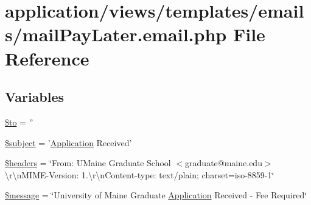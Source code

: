 \hypertarget{mail_pay_later_8email_8php}{\section{application/views/templates/emails/mail\-Pay\-Later.email.\-php File Reference}
\label{mail_pay_later_8email_8php}
}
\subsection*{Variables}
\begin{DoxyCompactItemize}
\item 
\hyperlink{mail_pay_later_8email_8php_ac19f839b525d6d99d063fe56bf2a6d3b}{\$to} = ''
\item 
\hyperlink{mail_pay_later_8email_8php_afea90503726cd5ad2eb80baf0b6d217d}{\$subject} = '\hyperlink{class_application}{Application} Received'
\item 
\hyperlink{mail_pay_later_8email_8php_a52500036ee807241b8b4b7e2367c49ef}{\$headers} = \char`\"{}From\-: U\-Maine Graduate School $<$graduate@maine.\-edu$>$\textbackslash{}r\textbackslash{}n\-M\-I\-M\-E-\/Version\-: 1.\textbackslash{}r\textbackslash{}n\-Content-\/type\-: text/plain; charset=iso-\/8859-\/1\char`\"{}
\item 
\hyperlink{mail_pay_later_8email_8php_abf17cb2dba2ed17cb28aa5f37deb5293}{\$message} = \char`\"{}University of Maine Graduate \hyperlink{class_application}{Application} Received -\/ Fee Required\char`\"{}
\end{DoxyCompactItemize}


